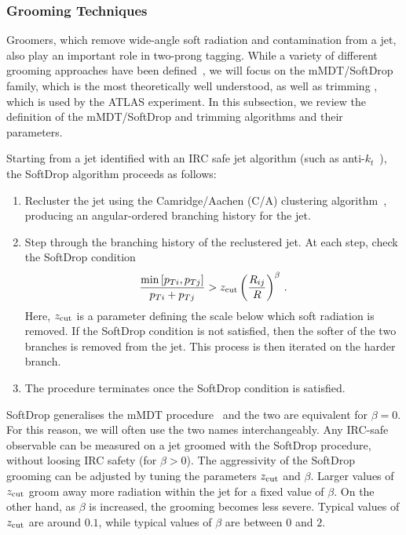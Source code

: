 \subsubsection{Grooming Techniques}\label{sec:SM_jetsub_2prong:groom_tech}

Groomers, which remove wide-angle soft radiation and contamination from a jet, also play an important role in two-prong tagging.
%
While a variety of different grooming approaches have been defined~\cite{Butterworth:2008iy,Ellis:2009su,Ellis:2009me,Krohn:2009th,Dasgupta:2013via,Dasgupta:2013ihk}, we will focus on the mMDT/SoftDrop family, which is the most theoretically well understood, as well as trimming \cite{Krohn:2009th}, which is used by the ATLAS experiment.
%
In this subsection, we review the definition of the mMDT/SoftDrop and trimming algorithms and their parameters.

Starting from a jet identified with an IRC safe jet algorithm (such as
anti-$k_t$~\cite{Cacciari:2008gp}), the SoftDrop algorithm proceeds as follows:
%
\begin{enumerate}
%
\item Recluster the jet using the Camridge/Aachen (C/A) clustering
  algorithm~\cite{Dokshitzer:1997in,Wobisch:1998wt,Wobisch:2000dk},
  producing an angular-ordered branching history for the jet.
%
\item Step through the branching history of the reclustered jet.  At each step, check the SoftDrop condition
\begin{align}\label{eq:SM_jetsub_2prong:sd_cut}
\frac{\min\left[ p_{Ti}, p_{Tj}  \right]}{p_{Ti}+p_{Tj}}> {z_{\rm cut}} \left(   \frac{R_{ij}}{R}\right)^\beta \,.
\end{align}
Here, ${z_{\rm cut}}$ is a parameter defining the scale below which soft radiation is removed.  If the SoftDrop condition is not satisfied, then the softer of the two branches is removed from the jet.  This process is then iterated on the harder branch.
%
\item The procedure terminates once the SoftDrop condition is satisfied.
%
\end{enumerate}
SoftDrop generalises the mMDT procedure~\cite{Dasgupta:2013ihk} and
the two are equivalent for $\beta=0$.
%
For this reason, we will often use
the two names interchangeably.
%
Any IRC-safe observable can be measured on a jet groomed with the
SoftDrop procedure, without loosing IRC safety (for $\beta > 0$).
%
The aggressivity of the SoftDrop grooming can be adjusted by
tuning the parameters ${z_{\rm cut}}$ and $\beta$.
%
Larger values of ${z_{\rm cut}}$ groom away more radiation within the jet for a fixed value of $\beta$.
%
On the other hand, as $\beta$ is increased, the grooming becomes less
severe.
%
Typical values of ${z_{\rm cut}}$ are around $0.1$, while typical
values of $\beta$ are between $0$ and $2$.

